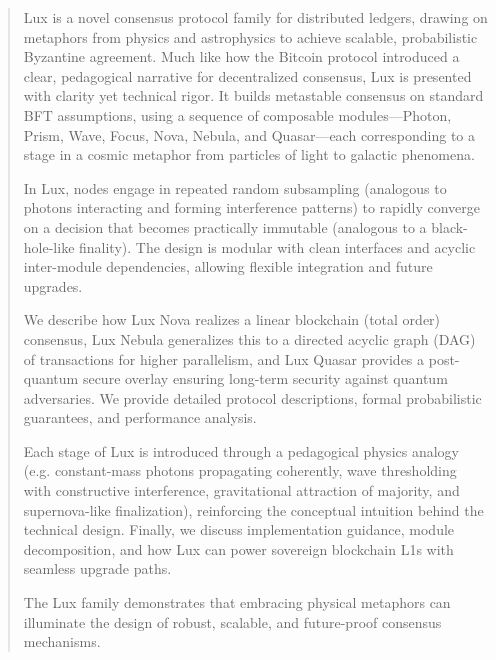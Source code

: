 \begin{abstract}

Lux is a novel consensus protocol family for distributed ledgers, drawing on metaphors from physics and astrophysics to achieve scalable, probabilistic Byzantine agreement. Much like how the Bitcoin protocol introduced a clear, pedagogical narrative for decentralized consensus, Lux is presented with clarity yet technical rigor. It builds metastable consensus on standard BFT assumptions, using a sequence of composable modules—Photon, Prism, Wave, Focus, Nova, Nebula, and Quasar—each corresponding to a stage in a cosmic metaphor from particles of light to galactic phenomena.

In Lux, nodes engage in repeated random subsampling (analogous to photons interacting and forming interference patterns) to rapidly converge on a decision that becomes practically immutable (analogous to a black-hole-like finality). The design is modular with clean interfaces and acyclic inter-module dependencies, allowing flexible integration and future upgrades.

We describe how Lux Nova realizes a linear blockchain (total order) consensus, Lux Nebula generalizes this to a directed acyclic graph (DAG) of transactions for higher parallelism, and Lux Quasar provides a post-quantum secure overlay ensuring long-term security against quantum adversaries. We provide detailed protocol descriptions, formal probabilistic guarantees, and performance analysis.

Each stage of Lux is introduced through a pedagogical physics analogy (e.g. constant-mass photons propagating coherently, wave thresholding with constructive interference, gravitational attraction of majority, and supernova-like finalization), reinforcing the conceptual intuition behind the technical design. Finally, we discuss implementation guidance, module decomposition, and how Lux can power sovereign blockchain L1s with seamless upgrade paths.

The Lux family demonstrates that embracing physical metaphors can illuminate the design of robust, scalable, and future-proof consensus mechanisms.

\end{abstract}